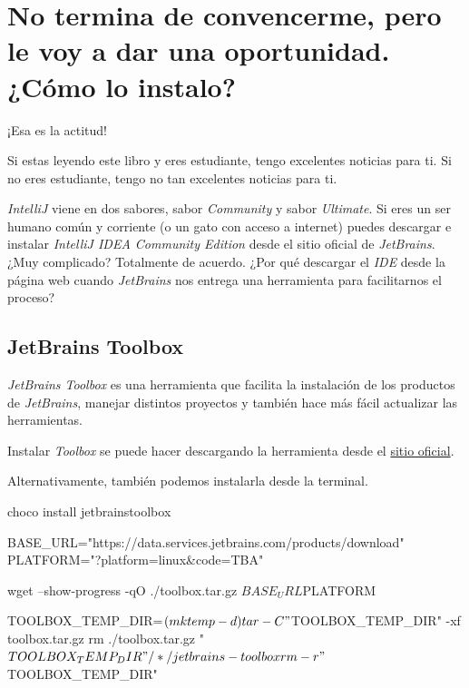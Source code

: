 \section{No termina de convencerme, pero le voy a dar una oportunidad. ¿Cómo lo instalo?}
  ¡Esa es la actitud!

  Si estas leyendo este libro y eres estudiante, tengo excelentes noticias para ti.
  Si no eres estudiante, tengo no tan excelentes noticias para ti.

  \textit{IntelliJ} viene en dos sabores, sabor \textit{Community} y sabor \textit{Ultimate}.
  Si eres un ser humano común y corriente (o un gato con acceso a internet) puedes descargar e 
  instalar \textit{IntelliJ IDEA Community Edition}\index{} desde el sitio oficial de \textit{JetBrains}.
  ¿Muy complicado?
  Totalmente de acuerdo.
  ¿Por qué descargar el \textit{IDE} desde la página web cuando \textit{JetBrains} nos entrega una
  herramienta para facilitarnos el proceso?
  
  \subsection{JetBrains Toolbox}
    \textit{JetBrains Toolbox} es una herramienta que facilita la instalación de los productos de
    \textit{JetBrains}, manejar distintos proyectos y también hace más fácil actualizar las
    herramientas.

    Instalar \textit{Toolbox} se puede hacer descargando la herramienta desde el 
    \href{https://www.jetbrains.com/toolbox-app/}{sitio oficial}.

    Alternativamente, también podemos instalarla desde la terminal.

    \begin{tcolorbox}[enhanced, breakable, title=Windows]
      \begin{powershell}
        choco install jetbrainstoolbox
      \end{powershell}
    \end{tcolorbox}
    
    \begin{tcolorbox}[enhanced, breakable, title=Linux/Mac]
      \begin{bash}
        BASE_URL="https://data.services.jetbrains.com/products/download"
        PLATFORM="?platform=linux&code=TBA"

        wget --show-progress -qO ./toolbox.tar.gz $BASE_URL$PLATFORM
        
        TOOLBOX_TEMP_DIR=$(mktemp -d)
        tar -C "$TOOLBOX_TEMP_DIR" -xf toolbox.tar.gz
        rm ./toolbox.tar.gz
        "$TOOLBOX_TEMP_DIR"/*/jetbrains-toolbox

        rm -r "$TOOLBOX_TEMP_DIR"
      \end{bash}
    \end{tcolorbox}

